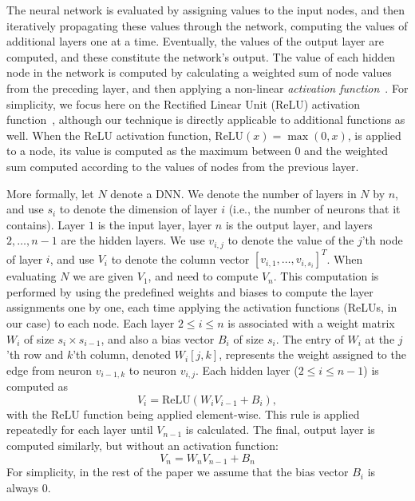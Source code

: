 \documentclass{easychair}
\newcommand{\relu}{\text{ReLU}\xspace{}}
\begin{document}
The neural network is evaluated by assigning values to the input
nodes, and then iteratively propagating these values through the
network, computing the values of additional layers one at a
time. Eventually, the values of the output layer are computed, and
these constitute the network's output.  The value of each hidden node
in the network is computed by calculating a weighted sum of node
values from the preceding layer, and then applying a non-linear
\emph{activation function}~\cite{FoBeCu16}.  For simplicity, we focus
here on the Rectified Linear Unit (ReLU) activation
function~\cite{NaHi10}, although our technique is directly applicable
to additional functions as well.  When the ReLU activation function,
$\relu{}(x) = \max{}(0, x)$, is applied to a node, its value is
computed as the maximum between $0$ and the weighted sum computed
according to the values of nodes from
the previous layer.

More formally, let $N$ denote a DNN. We
denote the number of layers in $N$ by $n$, and use $s_i$ to denote the
dimension of layer $i$ (i.e., the number of neurons that it contains).
Layer $1$ is the input layer, layer $n$ is the output layer, and
layers $2,\ldots,n-1$ are the hidden layers.
We use $v_{i,j}$  to denote the value of the $j$'th node of layer $i$,
and use $V_i$ to denote the column vector $[v_{i,1},\ldots,v_{i,s_i}]^T$.
When evaluating $N$ we are given $V_1$, and need to compute $V_n$.
This computation is 
performed by using the predefined weights and biases to compute the
layer assignments one by one, each time applying the activation
functions (ReLUs, in our case) to each node. Each layer $2\leq i\leq
n$
is associated
with a 
weight matrix $W_i$ of size $s_{i}\times s_{i-1}$, and also a bias vector $B_i$ of size
$s_i$. The entry of $W_i$ at the $j$'th row and $k$'th column, denoted
$W_i[j,k]$, represents the weight assigned to the edge from
neuron $v_{i-1,k}$ to neuron $v_{i,j}$.
Each hidden layer ($2\leq i \leq n-1$) 
is computed as
\[
V_i = \relu{}(W_i  V_{i-1} + B_i),
\]
with the ReLU
function being applied element-wise.
This rule is applied repeatedly for each layer until $V_{n-1}$ is
calculated.
The final, output layer is
computed similarly, but without an activation function:
\[
  V_n = W_n  V_{n-1} + B_n
\]
For simplicity, in the rest of the paper we assume that
the bias vector $B_i$ is always $0$.
\end{document}
